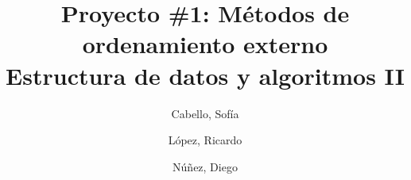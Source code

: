 \documentclass[11pt]{article}
\title{Proyecto \#1: Métodos de ordenamiento externo \\
Estructura de datos y algoritmos II}
\author{Cabello, Sofía
\and López, Ricardo
\and Núñez, Diego}
\begin{document}
\maketitle{}
\end{document}
